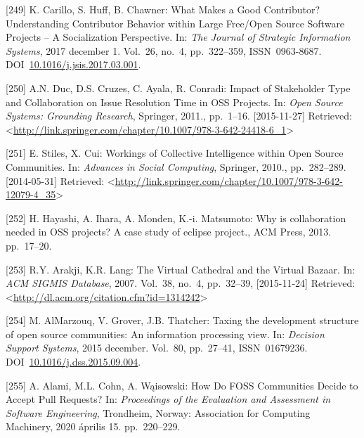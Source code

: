 \documentclass[12pt,magyar,a4paper,oneside]{scrreprt}
\newenvironment{cslreferences}%
  {}%
  {\par}
\begin{document}
\begin{cslreferences}
\leavevmode\hypertarget{ref-carillo_what_2017}{}%
{[}249{]} K. Carillo, S. Huff, B. Chawner: What Makes a Good
Contributor? Understanding Contributor Behavior within Large Free/Open
Source Software Projects -- A Socialization Perspective. In: \emph{The
Journal of Strategic Information Systems}, 2017 december 1. Vol.~26,
no.~4, pp.~322--359, ISSN~0963-8687.
DOI~\href{https://doi.org/10.1016/j.jsis.2017.03.001}{10.1016/j.jsis.2017.03.001}.

\leavevmode\hypertarget{ref-duc_impact_2011}{}%
{[}250{]} A.N. Duc, D.S. Cruzes, C. Ayala, R. Conradi: Impact of
Stakeholder Type and Collaboration on Issue Resolution Time in OSS
Projects. In: \emph{Open Source Systems: Grounding Research}, Springer,
2011., pp.~1--16. {[}2015-11-27{]} Retrieved:
\textless{}\url{http://link.springer.com/chapter/10.1007/978-3-642-24418-6_1}\textgreater{}

\leavevmode\hypertarget{ref-stiles_workings_2010}{}%
{[}251{]} E. Stiles, X. Cui: Workings of Collective Intelligence within
Open Source Communities. In: \emph{Advances in Social Computing},
Springer, 2010., pp.~282--289. {[}2014-05-31{]} Retrieved:
\textless{}\url{http://link.springer.com/chapter/10.1007/978-3-642-12079-4_35}\textgreater{}

\leavevmode\hypertarget{ref-hayashi_why_2013}{}%
{[}252{]} H. Hayashi, A. Ihara, A. Monden, K.-i. Matsumoto: Why is
collaboration needed in OSS projects? A case study of eclipse project.,
ACM Press, 2013. pp.~17--20.

\leavevmode\hypertarget{ref-arakji_virtual_2007}{}%
{[}253{]} R.Y. Arakji, K.R. Lang: The Virtual Cathedral and the Virtual
Bazaar. In: \emph{ACM SIGMIS Database}, 2007. Vol.~38, no.~4,
pp.~32--39, {[}2015-11-24{]} Retrieved:
\textless{}\url{http://dl.acm.org/citation.cfm?id=1314242}\textgreater{}

\leavevmode\hypertarget{ref-almarzouq_taxing_2015}{}%
{[}254{]} M. AlMarzouq, V. Grover, J.B. Thatcher: Taxing the development
structure of open source communities: An information processing view.
In: \emph{Decision Support Systems}, 2015 december. Vol.~80, pp.~27--41,
ISSN~01679236.
DOI~\href{https://doi.org/10.1016/j.dss.2015.09.004}{10.1016/j.dss.2015.09.004}.

\leavevmode\hypertarget{ref-alami_how_2020}{}%
{[}255{]} A. Alami, M.L. Cohn, A. Wąisowski: How Do FOSS Communities
Decide to Accept Pull Requests? In: \emph{Proceedings of the Evaluation
and Assessment in Software Engineering}, Trondheim, Norway: Association
for Computing Machinery, 2020 április 15. pp.~220--229.


\end{cslreferences}
\end{document}
